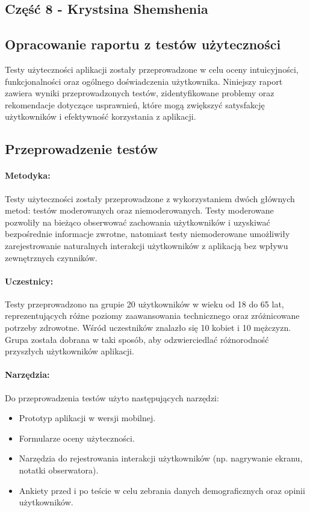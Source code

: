 \begin{center}
  \section{Część 8 - Krystsina Shemshenia}
  \subsection{Opracowanie raportu z testów użyteczności}
\end{center}

\quad Testy użyteczności aplikacji zostały przeprowadzone w celu oceny intuicyjności, funkcjonalności oraz ogólnego doświadczenia użytkownika. Niniejszy raport zawiera wyniki przeprowadzonych testów, zidentyﬁkowane problemy oraz rekomendacje dotyczące usprawnień, które mogą zwiększyć satysfakcję użytkowników i efektywność korzystania z aplikacji.

\begin{center}
  \subsection{Przeprowadzenie testów}
\end{center}

\paragraph{Metodyka:} Testy użyteczności zostały przeprowadzone z wykorzystaniem dwóch głównych metod: testów moderowanych oraz niemoderowanych. Testy moderowane pozwoliły na bieżąco obserwować zachowania użytkowników i uzyskiwać bezpośrednie informacje zwrotne, natomiast testy niemoderowane umożliwiły zarejestrowanie naturalnych interakcji użytkowników z aplikacją bez wpływu zewnętrznych czynników.

\paragraph{Uczestnicy:} Testy przeprowadzono na grupie 20 użytkowników w wieku od 18 do 65 lat, reprezentujących różne poziomy zaawansowania technicznego oraz zróżnicowane potrzeby zdrowotne. Wśród uczestników znalazło się 10 kobiet i 10 mężczyzn. Grupa została dobrana w taki sposób, aby odzwierciedlać różnorodność przyszłych użytkowników aplikacji.

\paragraph{Narzędzia:} Do przeprowadzenia testów użyto następujących narzędzi:
\begin{itemize}
  \item Prototyp aplikacji w wersji mobilnej.
  \item Formularze oceny użyteczności.
  \item Narzędzia do rejestrowania interakcji użytkowników (np. nagrywanie ekranu, notatki obserwatora).
  \item Ankiety przed i po teście w celu zebrania danych demograﬁcznych oraz opinii użytkowników.
\end{itemize}


